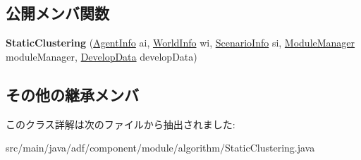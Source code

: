 \subsection*{公開メンバ関数}
\begin{DoxyCompactItemize}
\item 
\hypertarget{classadf_1_1component_1_1module_1_1algorithm_1_1StaticClustering_ab5d247783feee287d88f6ba353641d0b}{}\label{classadf_1_1component_1_1module_1_1algorithm_1_1StaticClustering_ab5d247783feee287d88f6ba353641d0b} 
{\bfseries Static\+Clustering} (\hyperlink{classadf_1_1agent_1_1info_1_1AgentInfo}{Agent\+Info} ai, \hyperlink{classadf_1_1agent_1_1info_1_1WorldInfo}{World\+Info} wi, \hyperlink{classadf_1_1agent_1_1info_1_1ScenarioInfo}{Scenario\+Info} si, \hyperlink{classadf_1_1agent_1_1module_1_1ModuleManager}{Module\+Manager} module\+Manager, \hyperlink{classadf_1_1agent_1_1develop_1_1DevelopData}{Develop\+Data} develop\+Data)
\end{DoxyCompactItemize}
\subsection*{その他の継承メンバ}


このクラス詳解は次のファイルから抽出されました\+:\begin{DoxyCompactItemize}
\item 
src/main/java/adf/component/module/algorithm/Static\+Clustering.\+java\end{DoxyCompactItemize}

